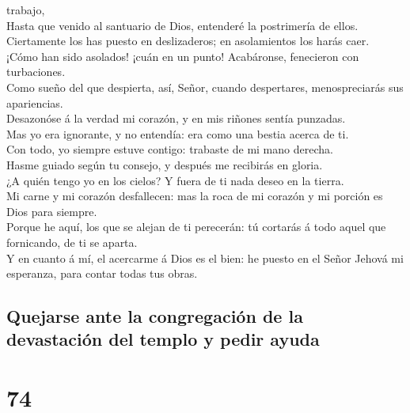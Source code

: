 trabajo,\\
 Hasta que venido al santuario de Dios, entenderé la
postrimería de ellos.\\
 Ciertamente los has puesto en deslizaderos; en
asolamientos los harás caer.\\
 ¡Cómo han sido asolados! ¡cuán en un punto! Acabáronse,
fenecieron con turbaciones.\\
 Como sueño del que despierta, así, Señor, cuando
despertares, menospreciarás sus apariencias.\\
 Desazonóse á la verdad mi corazón, y en mis riñones sentía
punzadas.\\
 Mas yo era ignorante, y no entendía: era como una bestia
acerca de ti.\\
 Con todo, yo siempre estuve contigo: trabaste de mi mano
derecha.\\
 Hasme guiado según tu consejo, y después me recibirás en
gloria.\\
 ¿A quién tengo yo en los cielos? Y fuera de ti nada deseo
en la tierra.\\
 Mi carne y mi corazón desfallecen: mas la roca de mi
corazón y mi porción es Dios para siempre.\\
 Porque he aquí, los que se alejan de ti perecerán: tú
cortarás á todo aquel que fornicando, de ti se aparta.\\
 Y en cuanto á mí, el acercarme á Dios es el bien: he
puesto en el Señor Jehová mi esperanza, para contar todas tus obras.

\hypertarget{quejarse-ante-la-congregaciuxf3n-de-la-devastaciuxf3n-del-templo-y-pedir-ayuda}{%
\subsection{Quejarse ante la congregación de la devastación del templo y
pedir
ayuda}\label{quejarse-ante-la-congregaciuxf3n-de-la-devastaciuxf3n-del-templo-y-pedir-ayuda}}

\hypertarget{section-73}{%
\section{74}\label{section-73}}

